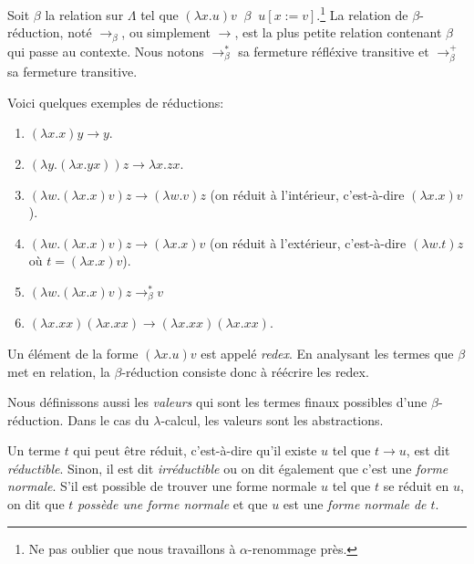 \begin{definition} 
  Soit $\beta$ la relation sur $\Lambda$ tel que $(\lambda x . u) v \; \; \beta 
  \; \; u[x := v]$.\footnote{Ne pas oublier que nous travaillons à
    $\alpha$-renommage près.}
  La relation de $\beta$-réduction, noté $\rightarrow_{\beta}$, ou simplement
  $\rightarrow$, est la plus petite relation contenant $\beta$ qui passe au
  contexte. Nous notons $\rightarrow^{*}_{\beta}$ sa fermeture réfléxive
  transitive et $\rightarrow^{+}_{\beta}$ sa fermeture transitive.
\end{definition}

Voici quelques exemples de réductions:
\begin{exemple}
  \begin{enumerate}
  \item $(\lambda x . x) y \rightarrow y$.
  \item $(\lambda y . (\lambda x . y x)) z \rightarrow \lambda x . z x$.
  \item $(\lambda w . (\lambda x . x) v) z \rightarrow (\lambda w. v) z$ (on
    réduit à l'intérieur, c'est-à-dire $(\lambda x . x) v$).
  \item $(\lambda w . (\lambda x . x) v) z \rightarrow (\lambda x. x) v$ (on
    réduit à l'extérieur, c'est-à-dire $(\lambda w . t) z$ où $t = (\lambda x .
    x) v$).
  \item $(\lambda w . (\lambda x . x) v) z \rightarrow^{*}_{\beta} v$
  \item $(\lambda x . xx) (\lambda x . xx) \rightarrow (\lambda x . xx)
    (\lambda x . xx)$.
  \end{enumerate}
\end{exemple}

Un élément de la forme $(\lambda x . u) v$ est appelé \textit{redex}. En
analysant les termes que $\beta$ met en relation, la
$\beta$-réduction consiste donc à réécrire les redex.

Nous définissons aussi les \textit{valeurs} qui sont les termes finaux
possibles d'une $\beta$-réduction. Dans le cas du $\lambda$-calcul, les valeurs
sont les abstractions.

Un terme $t$ qui peut être réduit, c'est-à-dire qu'il existe $u$ tel que $t
\rightarrow u$, est dit \textit{réductible}. Sinon, il est dit
\textit{irréductible} ou on dit également que c'est une \textit{forme normale}.
S'il est possible de trouver une forme normale $u$ tel que $t$ se réduit en $u$,
on dit que $t$ \textit{possède une forme normale} et que $u$ est une
\textit{forme normale de $t$}.

